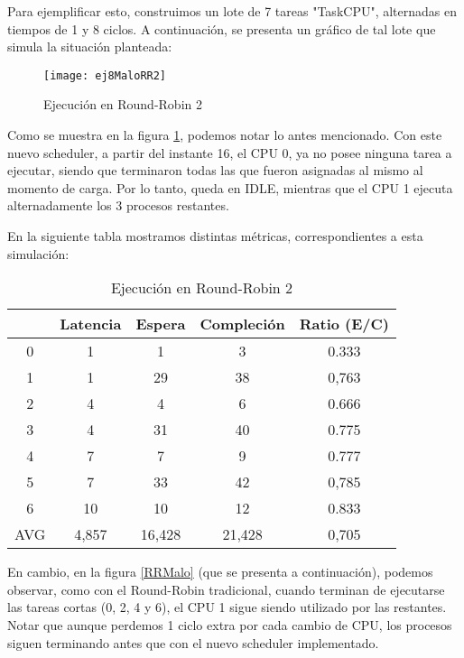 Para ejemplificar esto, construimos un lote de 7 tareas "TaskCPU", alternadas en tiempos de 1 y 8 ciclos. A continuación, se presenta un gráfico de tal lote que simula la situación planteada:

\begin{figure}[h]
    \texttt{[image: ej8MaloRR2]}
    \caption{Ejecución en Round-Robin 2}
    \label{RR2Malo}
\end{figure}

Como se muestra en la figura \ref{RR2Malo}, podemos notar lo antes mencionado. Con este nuevo scheduler, a partir del instante 16, el CPU 0, ya no posee ninguna tarea a ejecutar, siendo que terminaron todas las que fueron asignadas al mismo al momento de carga. Por lo tanto, queda en IDLE, mientras que el CPU 1 ejecuta alternadamente los 3 procesos restantes.

En la siguiente tabla mostramos distintas métricas, correspondientes a esta simulación:
\begin{table}[h]
  \caption{Ejecución en Round-Robin 2}
  \centering
    \begin{tabular}{c c c c c}
    \hline
          & Latencia & Espera & Compleción & Ratio (E/C) \\
    \hline
        0 &     1    &    1   &      3     &     0.333   \\
        1 &     1    &   29   &     38     &     0,763   \\
        2 &     4    &    4   &      6     &     0.666   \\
        3 &     4    &   31   &     40     &     0.775   \\
        4 &     7    &    7   &      9     &     0.777   \\
        5 &     7    &   33   &     42     &     0,785   \\
        6 &     10   &   10   &     12     &     0.833   \\
        AVG & 4,857  & 16,428 &   21,428   &     0,705   \\
    \end{tabular}
\end{table}


En cambio, en la figura \ref{RRMalo} (que se presenta a continuación), podemos observar, como con el Round-Robin tradicional, cuando terminan de ejecutarse las tareas cortas (0, 2, 4 y 6), el CPU 1 sigue siendo utilizado por las restantes. Notar que aunque perdemos 1 ciclo extra por cada cambio de CPU, los procesos siguen terminando antes que con el nuevo scheduler implementado.

